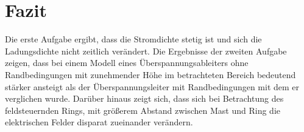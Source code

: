 \chapter{Fazit}\label{sec:fazit}
Die erste Aufgabe ergibt, dass die Stromdichte stetig ist und sich die Ladungsdichte nicht zeitlich verändert.  
Die Ergebnisse der zweiten Aufgabe zeigen, dass bei einem Modell eines Überspannungsableiters ohne Randbedingungen mit zunehmender Höhe im betrachteten Bereich bedeutend stärker ansteigt als der Überspannungsleiter mit Randbedingungen mit dem er verglichen wurde. Darüber hinaus zeigt sich, dass sich bei Betrachtung des feldsteuernden Rings, mit größerem Abstand zwischen Mast und Ring die elektrischen Felder disparat zueinander verändern.